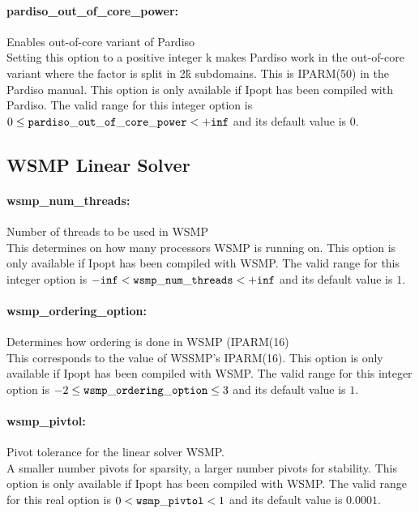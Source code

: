 \paragraph{pardiso\_out\_of\_core\_power:}\label{opt:pardiso_out_of_core_power} Enables out-of-core variant of Pardiso \\
 Setting this option to a positive integer k makes Pardiso work in the out-of-core variant where the factor is split in 2\^k subdomains.  This is IPARM(50) in the Pardiso manual.  This option is only available if Ipopt has been compiled with Pardiso. The valid range for this integer option is
$0 \le {\tt pardiso\_out\_of\_core\_power } <  {\tt +inf}$
and its default value is $0$.

\subsection{WSMP Linear Solver}

\paragraph{wsmp\_num\_threads:}\label{opt:wsmp_num_threads} Number of threads to be used in WSMP  \\
 This determines on how many processors WSMP is
running on.  This option is only available if
Ipopt has been compiled with WSMP. The valid range for this integer option is
${\tt -inf} <  {\tt wsmp\_num\_threads } <  {\tt +inf}$
and its default value is $1$.


\paragraph{wsmp\_ordering\_option:}\label{opt:wsmp_ordering_option} Determines how ordering is done in WSMP (IPARM(16)  \\
 This corresponds to the value of WSSMP's
IPARM(16).  This option is only available if
Ipopt has been compiled with WSMP. The valid range for this integer option is
$-2 \le {\tt wsmp\_ordering\_option } \le 3$
and its default value is $1$.


\paragraph{wsmp\_pivtol:}\label{opt:wsmp_pivtol} Pivot tolerance for the linear solver WSMP.  \\
 A smaller number pivots for sparsity, a larger
number pivots for stability.  This option is only
available if Ipopt has been compiled with WSMP. The valid range for this real option is 
$0 <  {\tt wsmp\_pivtol } <  1$
and its default value is $0.0001$.


